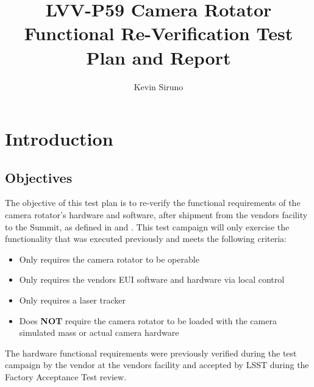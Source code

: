 \documentclass[SE,lsstdraft,STR,toc]{lsstdoc}
\providecommand{\tightlist}{
  \setlength{\itemsep}{0pt}\setlength{\parskip}{0pt}}
\begin{document}
\def\milestoneName{Camera Rotator Functional Re-Verification}
\def\milestoneId{LVV-P59}
\def\product{SIT-COM Integration}


\title{ LVV-P59 Camera Rotator Functional Re-Verification Test Plan and Report}
\setDocRef{\lsstDocType-\lsstDocNum}
\date{\vcsdate}
\author{ Kevin Siruno }






\maketitle

\section{Introduction}
\label{sect:intro}


\subsection{Objectives}
\label{sect:objectives}

The objective of this test plan is to re-verify the functional
requirements of the camera rotator's hardware and software, after
shipment from the vendors facility to the Summit, as defined in 
and . This test campaign will only exercise the functionality
that was executed previously and meets the following criteria:

\begin{itemize}
\tightlist
\item
  Only requires the camera rotator to be operable
\item
  Only requires the vendors EUI software and hardware via local control
\item
  Only requires a laser tracker
\item
  Does \textbf{NOT} require the camera rotator to be loaded with the
  camera simulated mass or actual camera hardware
\end{itemize}

The hardware functional requirements were previously verified during the
test campaign by the vendor at the vendors facility and accepted by LSST
during the Factory Acceptance Test review.
\end{document}
